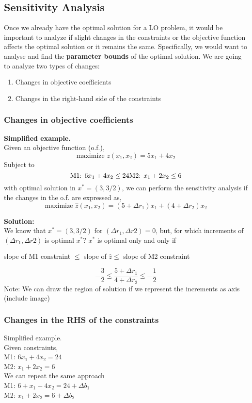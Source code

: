 \subsection{Sensitivity Analysis}
Once we already have the optimal solution for a LO problem, it would be important to analyze if slight changes in the constraints or the objective function
affects the optimal solution or it remains the same. Specifically, we would want to analyse and find the \textbf{parameter bounds} of the optimal solution.
We are going to analyze two types of changes:
\begin{enumerate}
    \item Changes in objective coefficients
    \item Changes in the right-hand side of the constraints    
\end{enumerate}

\subsubsection{Changes in objective coefficients}
\textbf{Simplified example.}\\
Given an objective function (o.f.),
\[ \text{maximize } z(x_1, x_2) = 5x_1 + 4x_2 \]
Subject to
\[ \text{M1: } 6x_1 + 4x_2 \leq 24 \\
    \text{M2: } x_1 + 2x_2 \leq 6
\]
with optimal solution in $x^* = (3, 3/2)$, we can perform the sensitivity analysis if the changes in the o.f. are expressed as,
\[ \text{maximize } \hat{z}(x_1, x_2) = (5+\Delta r_1)x_1 + (4 + \Delta r_2)x_2 \]

\textbf{Solution:}\\
We know that $x^* = (3, 3/2)$ for $(\Delta r_1, \Delta r2) = 0$, but, for which increments of $(\Delta r_1, \Delta r2)$ is optimal $x^*$?
$x^*$ is optimal only and only if
\begin{center}
    slope of M1 constraint $\leq$ slope of $\hat{z} \leq$ slope of M2 constraint
\end{center} 
\[ -\frac{3}{2} \leq \frac{5 + \Delta r_1}{4 + \Delta r_2} \leq -\frac{1}{2} \]
Note: We can draw the region of solution if we represent the increments as axis (include image)

\subsubsection{Changes in the RHS of the constraints}
Simplified example.\\
Given constraints,\\
M1: $ 6x_1 + 4x_2 = 24 $ \\
M2: $ x_1 + 2x_2 = 6 $\\
We can repeat the same approach\\
M1: $ 6+x_1 + 4x_2 = 24 + \Delta b_1 $\\
M2: $ x_1 + 2x_2 = 6 + \Delta b_2 $

